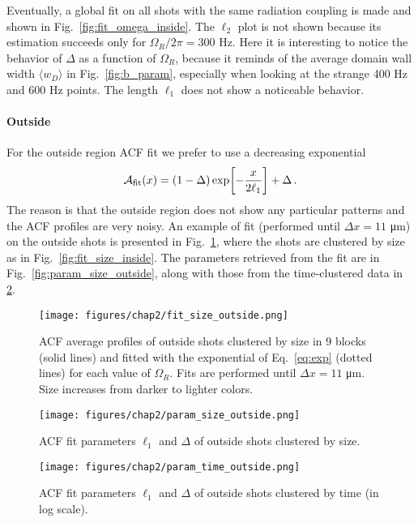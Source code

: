 Eventually, a global fit on all shots with the same radiation coupling is made and shown in Fig.\ \ref{fig:fit_omega_inside}. The $\ell_2$ plot is not shown because its estimation succeeds only for $\Omega_R/2\pi = 300$ \unit{\hertz}. Here it is interesting to notice the behavior of $\Delta$ as a function of $\Omega_R$, because it reminds of the average domain wall width $\langle w_D \rangle$ in Fig.\ \ref{fig:b_param}, especially when looking at the strange 400 Hz and 600 Hz points. The length $\ell_1$ does not show a noticeable behavior.

\paragraph{Outside}
For the outside region ACF fit we prefer to use a decreasing exponential
\begin{equation}
    \mathcal{A}_{\rm fit}(x) = (1-\Delta)\exp[-\frac{x}{2\ell_1}] + \Delta\, .
    \label{eq:exp}
\end{equation}
The reason is that the outside region does not show any particular patterns and the ACF profiles are very noisy.
An example of fit (performed until $\Delta x = 11$ \unit{\micro\meter}) on the outside shots is presented in Fig.\ \ref{fig:fit_size_outside}, where the shots are clustered by size as in Fig.\ \ref{fig:fit_size_inside}. The parameters retrieved from the fit are in Fig.\ \ref{fig:param_size_outside}, along with those from the time-clustered data in \ref{fig:param_time_outside}. 
\begin{figure}[ht!]
    \centering
    \texttt{[image: figures/chap2/fit\_size\_outside.png]}
    \caption{ACF average profiles of outside shots clustered by size in 9 blocks (solid lines) and fitted with the exponential of Eq.\ \eqref{eq:exp} (dotted lines) for each value of $\Omega_R$. Fits are performed until $\Delta x = 11$ \unit{\micro\meter}. Size increases from darker to lighter colors.}
    \label{fig:fit_size_outside}
\end{figure}
\begin{figure}[ht!]
    \centering
    \begin{minipage}[t]{0.47 \textwidth}
        \centering
        \texttt{[image: figures/chap2/param\_size\_outside.png]}
        \caption{ACF fit parameters $\ell_1$ and $\Delta$ of outside shots clustered by size.}
        \label{fig:param_size_outside}
    \end{minipage}
    \hspace{0.02\textwidth}
    \begin{minipage}[t]{0.47 \textwidth}
        \centering
        \texttt{[image: figures/chap2/param\_time\_outside.png]}
        \caption{ACF fit parameters $\ell_1$ and $\Delta$ of outside shots clustered by time (in log scale).}
        \label{fig:param_time_outside}
    \end{minipage}
\end{figure}
